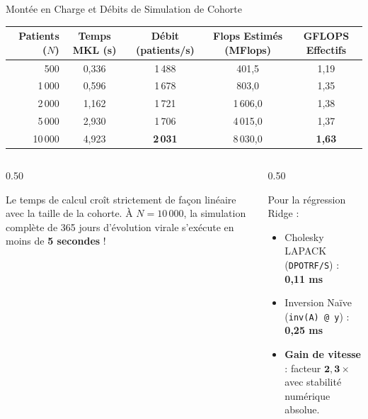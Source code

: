\documentclass[aspectratio=169, 10pt, french]{beamer}
\begin{document}
\begin{frame}{Montée en Charge et Débits de Simulation de Cohorte}
    \begin{center}
    \small
    \begin{tabular}{rcccc}
        \toprule
        \textbf{Patients ($N$)} & \textbf{Temps MKL (s)} & \textbf{Débit (patients/s)} & \textbf{Flops Estimés (MFlops)} & \textbf{GFLOPS Effectifs} \\
        \midrule
        500   & 0,336 & 1\,488 & 401,5  & 1,19 \\
        1\,000 & 0,596 & 1\,678 & 803,0  & 1,35 \\
        2\,000 & 1,162 & 1\,721 & 1\,606,0 & 1,38 \\
        5\,000 & 2,930 & 1\,706 & 4\,015,0 & 1,37 \\
        10\,000 & 4,923 & \textbf{2\,031} & 8\,030,0 & \textbf{1,63} \\
        \bottomrule
    \end{tabular}
    \end{center}

    \vspace{0.2cm}
    \begin{columns}[c]
        \begin{column}{0.50\textwidth}
            \begin{cadrehpc}
                \footnotesize
                Le temps de calcul croît strictement de façon linéaire avec la taille de la cohorte.
                À $N = 10\,000$, la simulation complète de 365 jours d'évolution virale s'exécute en moins de \textbf{5 secondes} !
            \end{cadrehpc}
        \end{column}
        \begin{column}{0.50\textwidth}
            \begin{cadreconcept}
                \footnotesize
                Pour la régression Ridge :
                \begin{itemize}
                    \item Cholesky LAPACK (\texttt{DPOTRF/S}) : \textbf{0,11 ms}
                    \item Inversion Naïve (\texttt{inv(A) @ y}) : \textbf{0,25 ms}
                    \item \textbf{Gain de vitesse} : facteur $\mathbf{2,3\times}$ avec stabilité numérique absolue.
                \end{itemize}
            \end{cadreconcept}
        \end{column}
    \end{columns}
\end{frame}
\end{document}
